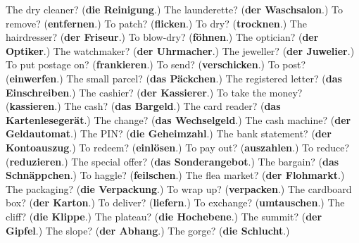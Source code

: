 \begin{tcolorbox}[breakable,colback=teal!4,colframe=teal!35!black,title={Before you move on}]
The dry cleaner? (\textbf{die Reinigung}.) The launderette? (\textbf{der Waschsalon}.) To remove? (\textbf{entfernen}.) To patch? (\textbf{flicken}.) To dry? (\textbf{trocknen}.) The hairdresser? (\textbf{der Friseur}.) To blow-dry? (\textbf{föhnen}.) The optician? (\textbf{der Optiker}.) The watchmaker? (\textbf{der Uhrmacher}.) The jeweller? (\textbf{der Juwelier}.) To put postage on? (\textbf{frankieren}.) To send? (\textbf{verschicken}.) To post? (\textbf{einwerfen}.) The small parcel? (\textbf{das Päckchen}.) The registered letter? (\textbf{das Einschreiben}.) The cashier? (\textbf{der Kassierer}.) To take the money? (\textbf{kassieren}.) The cash? (\textbf{das Bargeld}.) The card reader? (\textbf{das Kartenlesegerät}.) The change? (\textbf{das Wechselgeld}.) The cash machine? (\textbf{der Geldautomat}.) The PIN? (\textbf{die Geheimzahl}.) The bank statement? (\textbf{der Kontoauszug}.) To redeem? (\textbf{einlösen}.) To pay out? (\textbf{auszahlen}.) To reduce? (\textbf{reduzieren}.) The special offer? (\textbf{das Sonderangebot}.) The bargain? (\textbf{das Schnäppchen}.) To haggle? (\textbf{feilschen}.) The flea market? (\textbf{der Flohmarkt}.) The packaging? (\textbf{die Verpackung}.) To wrap up? (\textbf{verpacken}.) The cardboard box? (\textbf{der Karton}.) To deliver? (\textbf{liefern}.) To exchange? (\textbf{umtauschen}.) The cliff? (\textbf{die Klippe}.) The plateau? (\textbf{die Hochebene}.) The summit? (\textbf{der Gipfel}.) The slope? (\textbf{der Abhang}.) The gorge? (\textbf{die Schlucht}.)
\end{tcolorbox}
